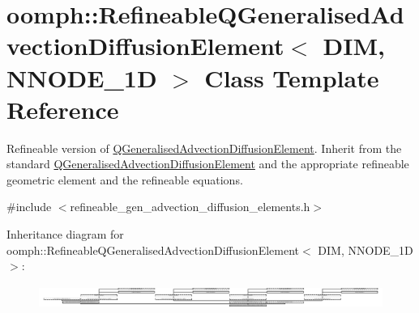 \hypertarget{classoomph_1_1RefineableQGeneralisedAdvectionDiffusionElement}{}\section{oomph\+:\+:Refineable\+Q\+Generalised\+Advection\+Diffusion\+Element$<$ D\+IM, N\+N\+O\+D\+E\+\_\+1D $>$ Class Template Reference}
\label{classoomph_1_1RefineableQGeneralisedAdvectionDiffusionElement}


Refineable version of \hyperlink{classoomph_1_1QGeneralisedAdvectionDiffusionElement}{Q\+Generalised\+Advection\+Diffusion\+Element}. Inherit from the standard \hyperlink{classoomph_1_1QGeneralisedAdvectionDiffusionElement}{Q\+Generalised\+Advection\+Diffusion\+Element} and the appropriate refineable geometric element and the refineable equations.  




{\ttfamily \#include $<$refineable\+\_\+gen\+\_\+advection\+\_\+diffusion\+\_\+elements.\+h$>$}

Inheritance diagram for oomph\+:\+:Refineable\+Q\+Generalised\+Advection\+Diffusion\+Element$<$ D\+IM, N\+N\+O\+D\+E\+\_\+1D $>$\+:\begin{figure}[H]
\begin{center}
\leavevmode
\includegraphics[height=0.784314cm]{classoomph_1_1RefineableQGeneralisedAdvectionDiffusionElement}
\end{center}
\end{figure}
